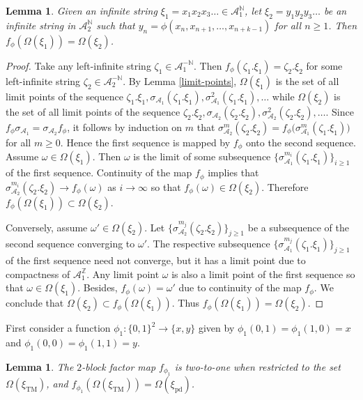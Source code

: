 \documentclass[12pt]{article}
\newtheorem{lemma}[theorem]{Lemma}
\theoremstyle{definition}
\def\bN{\mathbb{N}}
\def\bZ{\mathbb{Z}}
\def\cA{\mathcal{A}}
\def\om{\omega}
\def\si{\sigma}
\def\Om{\Omega}
\def\xiTM{\xi_{\mathrm{TM}}}
\def\xipd{\xi_{\mathrm{pd}}}
\begin{document}
\begin{lemma}\label{block-factor-0}
Given an infinite string $\xi_1=x_1x_2x_3\ldots\in\cA_1^{\bN}$, let 
$\xi_2=y_1y_2y_3\ldots$ be an infinite string in $\cA_2^{\bN}$ such that 
$y_n=\phi(x_n,x_{n+1},\dots,x_{n+k-1})$ for all $n\ge1$.  Then 
$f_\phi(\Om(\xi_1))=\Om(\xi_2)$.
\end{lemma}

\begin{proof}
Take any left-infinite string $\zeta_1\in\cA_1^{-\bN}$.  Then 
$f_\phi(\zeta_1.\xi_1)=\zeta_2.\xi_2$ for some left-infinite string 
$\zeta_2\in\cA_2^{-\bN}$.  By Lemma \ref{limit-points}, $\Om(\xi_1)$ is the 
set of all limit points of the sequence $\zeta_1.\xi_1, 
\si_{\cA_1}(\zeta_1.\xi_1),\si_{\cA_1}^2(\zeta_1.\xi_1),\dots$ while 
$\Om(\xi_2)$ is the set of all limit points of the sequence $\zeta_2.\xi_2, 
\si_{\cA_2}(\zeta_2.\xi_2),\si_{\cA_2}^2(\zeta_2.\xi_2),\dots$.  Since 
$f_\phi\si_{\cA_1}=\si_{\cA_2}f_\phi$, it follows by induction on $m$ that 
$\si_{\cA_2}^m(\zeta_2.\xi_2)= 
f_\phi\bigl(\si_{\cA_1}^m(\zeta_1.\xi_1)\bigr)$ for all $m\ge0$.  Hence the 
first sequence is mapped by $f_\phi$ onto the second sequence.  Assume 
$\om\in\Om(\xi_1)$.  Then $\om$ is the limit of some subsequence 
$\{\si_{\cA_1}^{m_i}(\zeta_1.\xi_1)\}_{i\ge1}$ of the first sequence.  
Continuity of the map $f_\phi$ implies that 
$\si_{\cA_2}^{m_i}(\zeta_2.\xi_2)\to f_\phi(\om)$ as $i\to\infty$ so that 
$f_\phi(\om)\in\Om(\xi_2)$.  Therefore 
$f_\phi(\Om(\xi_1))\subset\Om(\xi_2)$.

Conversely, assume $\om'\in\Om(\xi_2)$.  Let 
$\{\si_{\cA_2}^{m_j}(\zeta_2.\xi_2)\}_{j\ge1}$ be a subsequence of the 
second sequence converging to $\om'$.  The respective subsequence 
$\{\si_{\cA_1}^{m_j}(\zeta_1.\xi_1)\}_{j\ge1}$ of the first sequence need 
not converge, but it has a limit point due to compactness of
$\cA_1^{\bZ}$.  Any limit point $\om$ is also a limit point of the 
first sequence so that $\om\in\Om(\xi_1)$.  Besides, $f_\phi(\om)=\om'$ due 
to continuity of the map $f_\phi$.  We conclude that $\Om(\xi_2)\subset 
f_\phi(\Om(\xi_1))$.  Thus $f_\phi(\Om(\xi_1))=\Om(\xi_2)$.
\end{proof}

First consider a function $\phi_1:\{0,1\}^2\to\{x,y\}$ given by 
$\phi_1(0,1)=\phi_1(1,0)=x$ and $\phi_1(0,0)=\phi_1(1,1)=y$.

\begin{lemma}\label{block-factor-1}
The $2$-block factor map $f_{\phi_1}$ is two-to-one when restricted to the 
set $\Om(\xiTM)$, and $f_{\phi_1}(\Om(\xiTM))=\Om(\xipd)$.
\end{lemma}
\end{document}
